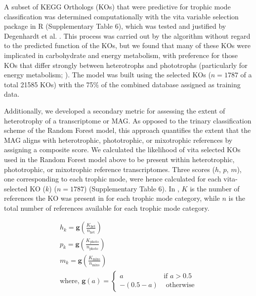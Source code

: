 \documentclass[12pt]{article}
\numberwithin{equation}{section}
\begin{document}
A subset of KEGG Orthologs (KOs) that were predictive for trophic mode classification was determined computationally with the vita variable selection package in R \citep{Janitza_2016} (Supplementary Table 6), which was tested and justified by Degenhardt et al. \citet{Degenhardt_2017}. This process was carried out by the algorithm without regard to the predicted function of the KOs, but we found that many of these KOs were implicated in carbohydrate and energy metabolism, with preference for those KOs that differ strongly between heterotrophs and phototrophs (particularly for energy metabolism; ). The model was built using the selected KOs ($n=1787$ of a total 21585 KOs) with the 75\% of the combined database assigned as training data.

Additionally, we developed a secondary metric for assessing the extent of heterotrophy of a transcriptome or MAG. As opposed to the trinary classification scheme of the Random Forest model, this approach quantifies the extent that the MAG aligns with heterotrophic, phototrophic, or mixotrophic references by assigning a composite score. We calculated the likelihood of vita selected KOs used in the Random Forest model above to be present within heterotrophic, phototrophic, or mixotrophic reference transcriptomes. Three scores ($h$, $p$, $m$), one corresponding to each trophic mode, were hence calculated for each vita-selected  KO ($k$) ($n=1787$) (Supplementary Table 6). In  , $K$ is the number of references the KO was present in for each trophic mode category, while $n$ is the total number of references available for each trophic mode category.

\begin{gather}\label{eq:hks}
    h_k = \mathbf{g}\left(\frac{K_\textrm{het}}{n_\textrm{het}}\right)\\
    p_k = \mathbf{g}\left(\frac{K_\textrm{photo}}{n_\textrm{photo}}\right)\\
    m_k = \mathbf{g}\left(\frac{K_\textrm{mixo}}{n_\textrm{mixo}}\right)\\
    \text{where, } \mathbf{g}(a) = \begin{cases}
       a & \textrm{if } a > 0.5 \\
       -(0.5-a) & \textrm{ otherwise} \label{eq:connectfinal}
    \end{cases} 
\end{gather}
\end{document}
